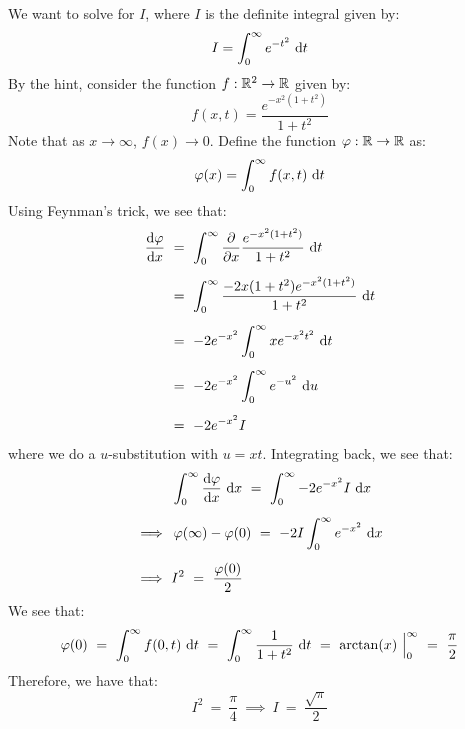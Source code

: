 \documentclass{article}
\begin{document}
\begin{soln}
    We want to solve for $ I $, where $ I $ is the definite integral given by:
    \begin{equation*}
        I = \int_{0}^{\infty}e^{-t^{2}}\textrm{ d} t
    \end{equation*}
    By the hint, consider the function $ f:\mathbb{R}^{2}\rightarrow\mathbb{R} $ given by:
    \begin{equation*}
        f(x,t) = \frac{e^{-x^{2}(1+t^{2})}}{1+t^{2}}
    \end{equation*}
    Note that as $ x \rightarrow \infty $, $ f(x) \rightarrow 0 $.
    Define the function $ \operatorname{\varphi}:\mathbb{R}\rightarrow\mathbb{R} $ as:
    \begin{equation*}
        \operatorname{\varphi}(x) = \int_{0}^{\infty}f(x,t)\textrm{ d} t
    \end{equation*}
    Using Feynman's trick, we see that:
    \begin{align*}
        \frac{\d\!\vphi}{\d x} \ & = \ \int_{0}^{\infty} \frac{\p}{\p x} \frac{e^{-x^{2}(1+t^{2})}}
        {1+t^{2}} \di t \vsp
        & = \ \int_{0}^{\infty}\frac{-2x(1+t^{2})e^{-x^{2}(1+t^{2})}}{1+t^{2}} \di t \vsp
        & = \ -2e^{-x^{2}}\int_{0}^{\infty} xe^{-x^{2}t^{2}} \di t \vsp
        & = \ -2e^{-x^{2}}\int_{0}^{\infty}e^{-u^{2}}\di u \vsp
        & = \ -2e^{-x^{2}}I
    \end{align*}
    where we do a $ u $-substitution with $ u = xt $.
    Integrating back, we see that:
    \begin{align*}
        & \int_{0}^{\infty} \frac{\d\!\vphi}{\d x}\di x \ = \ \int_{0}^{\infty}-2e^{-x^{2}}I\di x
        \vsp
        \implies \ & \vphi(\infty) - \vphi(0) \ = \ -2I\int_{0}^{\infty}e^{-x^{2}}\di x \vsp
        \implies \ & I^{2} \ = \ \frac{\vphi(0)}{2}
    \end{align*}
    We see that:
    \begin{equation*}
        \vphi(0) \ = \ \int_{0}^{\infty}f(0,t)\di t \ = \ \int_{0}^{\infty}\frac{1}{1+t^{2}} \di t
        \ = \ \arctan(x) \ \Big|_{0}^{\infty} \ = \ \frac{\pi}{2}
    \end{equation*}
    Therefore, we have that:
    \begin{equation*}
        I^{2} \ = \ \frac{\pi}{4} \ \implies \ I \ = \ \frac{\sqrt{\pi}}{2}
    \end{equation*}
\end{soln}
\end{document}
